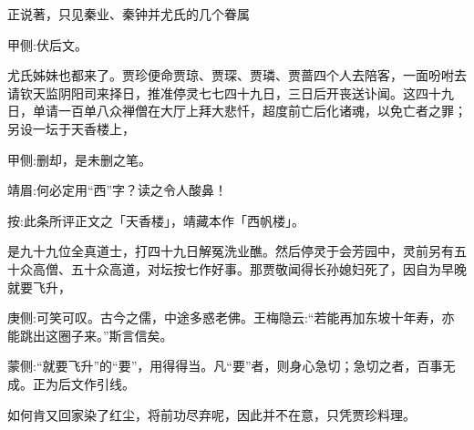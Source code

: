 \begin{parag}
    正说著，只见秦业、秦钟并尤氏的几个眷属\begin{note}甲侧:伏后文。\end{note}尤氏姊妹也都来了。贾珍便命贾琼、贾琛、贾璘、贾蔷四个人去陪客，一面吩咐去请钦天监阴阳司来择日，推准停灵七七四十九日，三日后开丧送讣闻。这四十九日，单请一百单八众禅僧在大厅上拜大悲忏，超度前亡后化诸魂，以免亡者之罪；另设一坛于天香楼上，\begin{note}甲侧:删却，是未删之笔。\end{note}\begin{note}靖眉:何必定用“西”字？读之令人酸鼻！\end{note}\begin{subnote}按:此条所评正文之「天香楼」，靖藏本作「西帆楼」。\end{subnote}是九十九位全真道士，打四十九日解冤洗业醮。然后停灵于会芳园中，灵前另有五十众高僧、五十众高道，对坛按七作好事。那贾敬闻得长孙媳妇死了，因自为早晚就要飞升，\begin{note}庚侧:可笑可叹。古今之儒，中途多惑老佛。王梅隐云:“若能再加东坡十年寿，亦能跳出这圈子来。”斯言信矣。\end{note}\begin{note}蒙侧:“就要飞升”的“要”，用得得当。凡“要”者，则身心急切；急切之者，百事无成。正为后文作引线。\end{note}如何肯又回家染了红尘，将前功尽弃呢，因此并不在意，只凭贾珍料理。
\end{parag}


